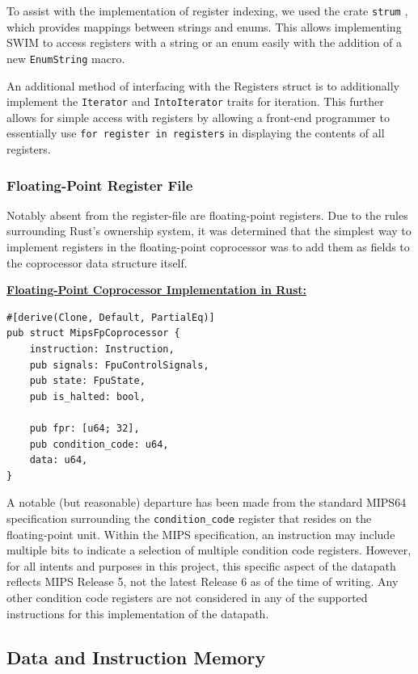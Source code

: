 \documentclass[
    paper=letter,
    parskip=half,
    fontsize=12pt,
    titlepage=firstiscover,
    toc=bibliography,
    numbers=endperiod
]{scrartcl}
\begin{document}
To assist with the implementation of register indexing, we used the
crate \texttt{strum} \cite{strum}, which provides mappings between
strings and enums. This allows implementing SWIM to access registers
with a string or an enum easily with the addition of a new
\texttt{EnumString} macro.

An additional method of interfacing with the Registers struct is to
additionally implement the \texttt{Iterator} and \texttt{IntoIterator}
traits for iteration. This further allows for simple access with
registers by allowing a front-end programmer to essentially use
\texttt{for register in registers} in displaying the contents of all
registers.

\subsubsection{Floating-Point Register File}

Notably absent from the register-file are floating-point registers. Due
to the rules surrounding Rust's ownership system, it was determined that
the simplest way to implement registers in the floating-point
coprocessor was to add them as fields to the coprocessor data structure
itself.

\underline{\textbf{Floating-Point Coprocessor Implementation in Rust:}}
\begin{verbatim}
#[derive(Clone, Default, PartialEq)]
pub struct MipsFpCoprocessor {
    instruction: Instruction,
    pub signals: FpuControlSignals,
    pub state: FpuState,
    pub is_halted: bool,

    pub fpr: [u64; 32],
    pub condition_code: u64,
    data: u64,
}
\end{verbatim}

A notable (but reasonable) departure has been made from the standard
MIPS64 specification surrounding the \texttt{condition\_code} register
that resides on the floating-point unit. Within the MIPS specification,
an instruction may include multiple bits to indicate a selection of
multiple condition code registers. However, for all intents and purposes
in this project, this specific aspect of the datapath reflects MIPS
Release 5, not the latest Release 6 as of the time of writing. Any other
condition code registers are not considered in any of the supported
instructions for this implementation of the datapath.

\subsection{Data and Instruction Memory}
\end{document}
